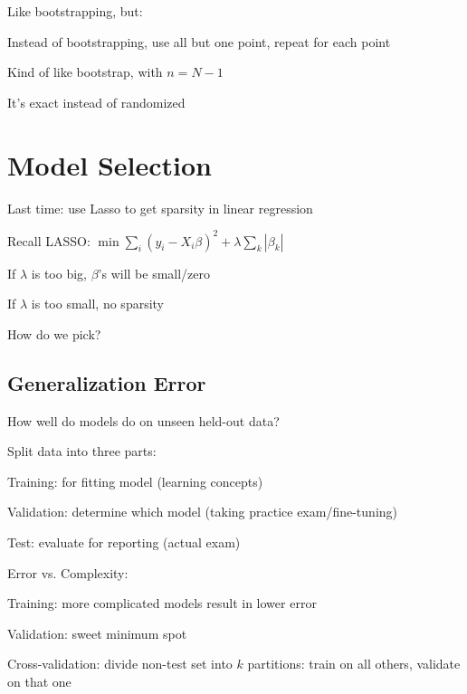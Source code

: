 \documentclass[twoside]{article}
\begin{document}
Like bootstrapping, but:

Instead of bootstrapping, use all but one point, repeat for each point

Kind of like bootstrap, with $n = N-1$

It's exact instead of randomized

\section{Model Selection}

Last time: use Lasso to get sparsity in linear regression

Recall LASSO: $\min{ \sum\limits_{i} (y_i - X_i \beta )^2 + \lambda \sum\limits_{k} |\beta_k| }$

If $\lambda$ is too big, $\beta$'s will be small/zero

If $\lambda$ is too small, no sparsity

How do we pick?

\subsection{Generalization Error}

How well do models do on unseen held-out data?

Split data into three parts:

Training: for fitting model (learning concepts)

Validation: determine which model (taking practice exam/fine-tuning)

Test: evaluate for reporting (actual exam)


Error vs. Complexity:

Training: more complicated models result in lower error

Validation: sweet minimum spot

Cross-validation: divide non-test set into $k$ partitions: train on all others, validate on that one
\end{document}
